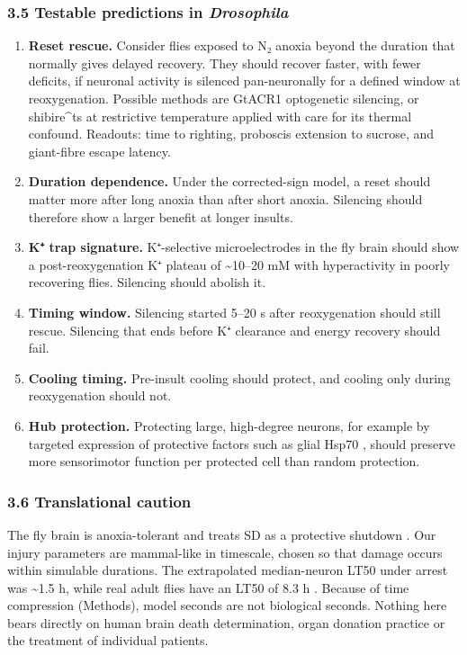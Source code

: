 \documentclass[11pt]{article}
\providecommand{\tightlist}{\setlength{\itemsep}{0pt}\setlength{\parskip}{0pt}}
\begin{document}
\subsubsection{\texorpdfstring{3.5 Testable predictions in \emph{Drosophila}}{3.5 Testable predictions in Drosophila}}\label{testable-predictions-in-drosophila}

\begin{enumerate}
\def\labelenumi{\arabic{enumi}.}
\tightlist
\item
  \textbf{Reset rescue.} Consider flies exposed to N₂ anoxia beyond the duration that normally gives delayed recovery. They should recover faster, with fewer deficits, if neuronal activity is silenced pan-neuronally for a defined window at reoxygenation. Possible methods are GtACR1 optogenetic silencing, or shibire\^{}ts at restrictive temperature applied with care for its thermal confound. Readouts: time to righting, proboscis extension to sucrose, and giant-fibre escape latency.
\item
  \textbf{Duration dependence.} Under the corrected-sign model, a reset should matter more after long anoxia than after short anoxia. Silencing should therefore show a larger benefit at longer insults.
\item
  \textbf{K⁺ trap signature.} K⁺-selective microelectrodes in the fly brain \cite{armstrong2011,rodriguez2012} should show a post-reoxygenation K⁺ plateau of \textasciitilde10--20 mM with hyperactivity in poorly recovering flies. Silencing should abolish it.
\item
  \textbf{Timing window.} Silencing started 5--20 s after reoxygenation should still rescue. Silencing that ends before K⁺ clearance and energy recovery should fail.
\item
  \textbf{Cooling timing.} Pre-insult cooling should protect, and cooling only during reoxygenation should not.
\item
  \textbf{Hub protection.} Protecting large, high-degree neurons, for example by targeted expression of protective factors such as glial Hsp70 \cite{armstrong2011}, should preserve more sensorimotor function per protected cell than random protection.
\end{enumerate}

\subsubsection{3.6 Translational caution}\label{translational-caution}

The fly brain is anoxia-tolerant and treats SD as a protective shutdown \cite{robertson2020,campbell2018}. Our injury parameters are mammal-like in timescale, chosen so that damage occurs within simulable durations. The extrapolated median-neuron LT50 under arrest was \textasciitilde1.5 h, while real adult flies have an LT50 of 8.3 h \cite{callier2015}. Because of time compression (Methods), model seconds are not biological seconds. Nothing here bears directly on human brain death determination, organ donation practice or the treatment of individual patients.
\end{document}
